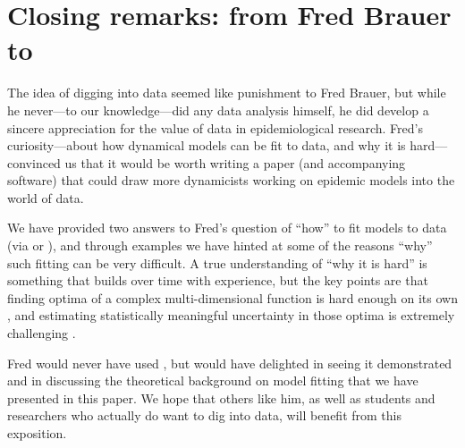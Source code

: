 \documentclass[]{interact}\usepackage[]{graphicx}\usepackage[]{xcolor}
\theoremstyle{plain}%
\theoremstyle{definition}
\theoremstyle{remark}
\newcommand{\code}[1]{\texttt{\detokenize{#1}}}
\begin{document}
\section{Closing remarks: from Fred Brauer to \code{fitode}}

The idea of digging into data seemed like punishment to Fred
Brauer, but while he never---to our knowledge---did any data analysis
himself, he did develop a sincere appreciation for the value of data
in epidemiological research.  Fred's curiosity---about how dynamical
models can be fit to data, and why it is hard---convinced us that it
would be worth writing a paper (and accompanying software) that could
draw more dynamicists working on epidemic models into the world of
data.

We have provided two answers to Fred's question of ``how'' to fit
models to data (via \code{nls} or \code{fitode}), and through examples
we have hinted at some of the reasons ``why'' such fitting can be very
difficult.  A true understanding of ``why it is hard'' is something
that builds over time with experience, but the key points are that
finding optima of a complex multi-dimensional function is hard enough
on its own \citep{raue2013lessons}, and estimating statistically
meaningful uncertainty in those optima is extremely challenging
\citep{elderd2006uncertainty,li2018fitting}.

Fred would never have used \code{fitode}, but would have delighted in
seeing it demonstrated and in discussing the theoretical background on
model fitting that we have presented in this paper.  We hope that
others like him, as well as students and researchers who actually do
want to dig into data, will benefit from this exposition.



\end{document}
